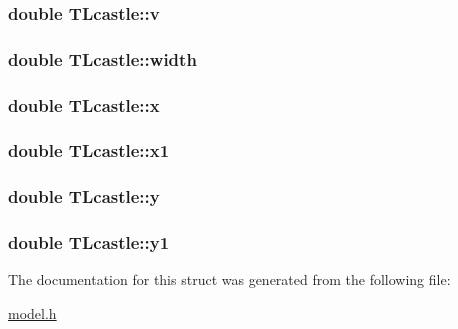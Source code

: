 \subsubsection[{\texorpdfstring{v}{v}}]{\setlength{\rightskip}{0pt plus 5cm}double T\+Lcastle\+::v}\hypertarget{struct_t_lcastle_a2cd8f5c58a7823cfbf48767a6edac665}{}\label{struct_t_lcastle_a2cd8f5c58a7823cfbf48767a6edac665}
\subsubsection[{\texorpdfstring{width}{width}}]{\setlength{\rightskip}{0pt plus 5cm}double T\+Lcastle\+::width}\hypertarget{struct_t_lcastle_a88b2109bd0ed0f20b5cbfdc6be7b1eb8}{}\label{struct_t_lcastle_a88b2109bd0ed0f20b5cbfdc6be7b1eb8}
\subsubsection[{\texorpdfstring{x}{x}}]{\setlength{\rightskip}{0pt plus 5cm}double T\+Lcastle\+::x}\hypertarget{struct_t_lcastle_a3803e440a150db207c62e238b83fdbea}{}\label{struct_t_lcastle_a3803e440a150db207c62e238b83fdbea}
\subsubsection[{\texorpdfstring{x1}{x1}}]{\setlength{\rightskip}{0pt plus 5cm}double T\+Lcastle\+::x1}\hypertarget{struct_t_lcastle_a8c12c4bd254741e7a5f48b1f905d7c4a}{}\label{struct_t_lcastle_a8c12c4bd254741e7a5f48b1f905d7c4a}
\subsubsection[{\texorpdfstring{y}{y}}]{\setlength{\rightskip}{0pt plus 5cm}double T\+Lcastle\+::y}\hypertarget{struct_t_lcastle_a38ca0e0f50130012db659383e82655ce}{}\label{struct_t_lcastle_a38ca0e0f50130012db659383e82655ce}
\subsubsection[{\texorpdfstring{y1}{y1}}]{\setlength{\rightskip}{0pt plus 5cm}double T\+Lcastle\+::y1}\hypertarget{struct_t_lcastle_a0aafc497ff39399c90028c0f52fc855d}{}\label{struct_t_lcastle_a0aafc497ff39399c90028c0f52fc855d}


The documentation for this struct was generated from the following file\+:\begin{DoxyCompactItemize}
\item 
\hyperlink{model_8h}{model.\+h}\end{DoxyCompactItemize}
